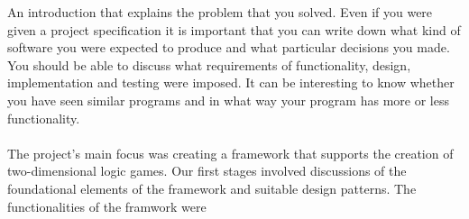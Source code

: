 \documentclass[main.tex]{subfiles}
\begin{document}
An introduction that explains the problem that you solved. Even if you were given a project specification it is important that you can write down what kind of software you were expected to produce and what particular decisions you made. You should be able to discuss what requirements of functionality, design, implementation and testing were imposed. It can be interesting to know whether you have seen similar programs and in what way your program has more or less functionality.
\\ \\
The project's main focus was creating a framework that supports the creation of two-dimensional logic games. Our first stages involved discussions of the foundational elements of the framework and suitable design patterns. The functionalities of the framwork were 
\end{document}
